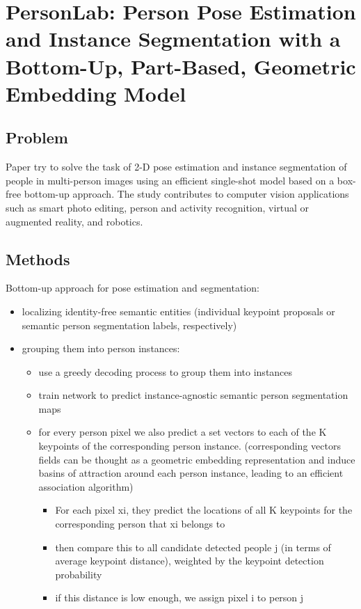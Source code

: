 \section{PersonLab: Person Pose Estimation and Instance Segmentation with a Bottom-Up, Part-Based, Geometric Embedding Model
\cite{DBLP:journals/corr/abs-1803-08225}}

\subsection{Problem}
\par Paper try to solve the task of 2-D pose estimation and instance segmentation of people in multi-person images using an efficient single-shot model based on a box-free bottom-up approach. 
The study contributes to computer vision applications such as smart photo editing, person and activity recognition, virtual or augmented reality, and robotics. 

\subsection{Methods}
 Bottom-up approach for pose estimation and segmentation:
 \begin{itemize}
 \item localizing identity-free semantic entities (individual keypoint proposals or semantic person segmentation labels, respectively)
    \item grouping them into person instances:
    \begin{itemize}
        \item use a greedy decoding process to group them into instances
        \item train network to predict instance-agnostic semantic person segmentation maps
        \item for every person pixel we also predict a set vectors to each of the K keypoints of the corresponding person instance. (corresponding vectors fields can be thought as a geometric embedding representation and induce basins of attraction around each person instance, leading to an efficient association algorithm)
         \begin{itemize}
         \item For each pixel xi, they predict the locations of all K keypoints for the corresponding person that xi belongs to
         \item then compare this to all candidate detected people j (in terms of average keypoint distance), weighted by the keypoint detection probability 
         \item if this distance is low enough, we assign pixel i to person j

         \end{itemize}
    \end{itemize}
 \end{itemize}


